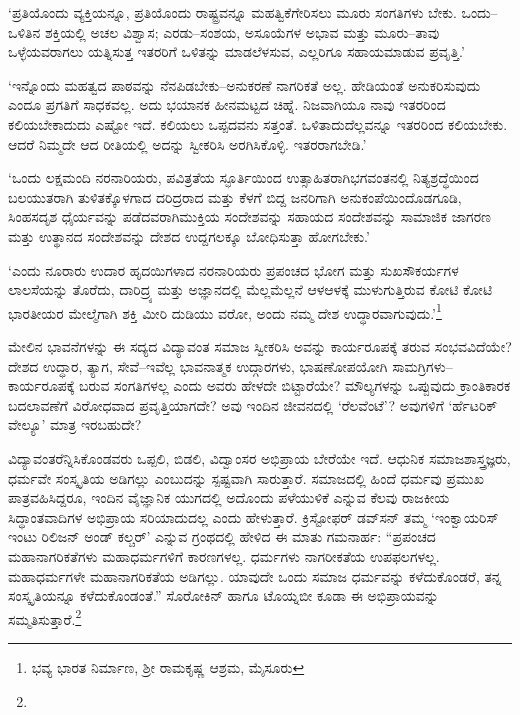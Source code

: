 ‘ಪ್ರತಿಯೊಂದು ವ್ಯಕ್ತಿಯನ್ನೂ, ಪ್ರತಿಯೊಂದು ರಾಷ್ಟ್ರವನ್ನೂ ಮಹತ್ವಿಕೆಗೇರಿಸಲು ಮೂರು ಸಂಗತಿಗಳು ಬೇಕು. ಒಂದು–ಒಳಿತಿನ ಶಕ್ತಿಯಲ್ಲಿ ಅಚಲ ವಿಶ್ವಾಸ; ಎರಡು–ಸಂಶಯ, ಅಸೂಯೆಗಳ ಅಭಾವ ಮತ್ತು ಮೂರು–ತಾವು ಒಳ್ಳೆಯವರಾಗಲು ಯತ್ನಿಸುತ್ತ ಇತರರಿಗೆ ಒಳಿತನ್ನು ಮಾಡ\-ಲೆಳಸುವ, ಎಲ್ಲರಿಗೂ ಸಹಾಯಮಾಡುವ ಪ್ರವೃತ್ತಿ.’

‘ಇನ್ನೊಂದು ಮಹತ್ವದ ಪಾಠವನ್ನು ನೆನಪಿಡಬೇಕು–ಅನುಕರಣೆ ನಾಗರಿಕತೆ ಅಲ್ಲ. ಹೇಡಿಯಂತೆ ಅನುಕರಿಸುವುದು ಎಂದೂ ಪ್ರಗತಿಗೆ ಸಾಧಕವಲ್ಲ. ಅದು ಭಯಾನಕ ಹೀನಮಟ್ಟದ ಚಿಹ್ನೆ. ನಿಜವಾಗಿಯೂ ನಾವು ಇತರರಿಂದ ಕಲಿಯಬೇಕಾದುದು ಎಷ್ಟೋ ಇದೆ. ಕಲಿಯಲು ಒಪ್ಪದವನು ಸತ್ತಂತೆ. ಒಳಿತಾದುದೆಲ್ಲವನ್ನೂ ಇತರರಿಂದ ಕಲಿಯಬೇಕು. ಆದರೆ ನಿಮ್ಮದೇ ಆದ ರೀತಿಯಲ್ಲಿ ಅದನ್ನು ಸ್ವೀಕರಿಸಿ ಅರಗಿಸಿಕೊಳ್ಳಿ. ಇತರರಾಗಬೇಡಿ.’

‘ಒಂದು ಲಕ್ಷಮಂದಿ ನರನಾರಿಯರು, ಪವಿತ್ರತೆಯ ಸ್ಫೂರ್ತಿಯಿಂದ ಉತ್ಸಾಹಿತರಾಗಿ\break ಭಗವಂತನಲ್ಲಿ ನಿತ್ಯಶ್ರದ್ಧೆಯಿಂದ ಬಲಯುತರಾಗಿ ತುಳಿತಕ್ಕೊಳಗಾದ ದರಿದ್ರರಾದ ಮತ್ತು ಕೆಳಗೆ ಬಿದ್ದ ಜನರಿಗಾಗಿ ಅನುಕಂಪೆಯಿಂದೊಡಗೂಡಿ, ಸಿಂಹಸದೃಶ ಧೈರ್ಯವನ್ನು ಪಡೆದವರಾಗಿ\break ಮುಕ್ತಿಯ ಸಂದೇಶವನ್ನು ಸಹಾಯದ ಸಂದೇಶವನ್ನು ಸಾಮಾಜಿಕ ಜಾಗರಣ ಮತ್ತು ಉತ್ಥಾನದ ಸಂದೇಶವನ್ನು ದೇಶದ ಉದ್ದಗಲಕ್ಕೂ ಬೋಧಿಸುತ್ತಾ ಹೋಗಬೇಕು.’

‘ಎಂದು ನೂರಾರು ಉದಾರ ಹೃದಯಿಗಳಾದ ನರನಾರಿಯರು ಪ್ರಪಂಚದ ಭೋಗ ಮತ್ತು ಸುಖಸೌಕರ್ಯಗಳ ಲಾಲಸೆಯನ್ನು ತೊರೆದು, ದಾರಿದ್ರ್ಯ ಮತ್ತು ಅಜ್ಞಾನದಲ್ಲಿ ಮೆಲ್ಲಮೆಲ್ಲನೆ ಆಳಆಳಕ್ಕೆ ಮುಳುಗುತ್ತಿರುವ ಕೋಟಿ ಕೋಟಿ ಭಾರತೀಯರ ಮೇಲ್ಮೆಗಾಗಿ ಶಕ್ತಿ ಮೀರಿ ದುಡಿಯು ವರೋ, ಅಂದು ನಮ್ಮ ದೇಶ ಉದ್ಧಾರವಾಗುವುದು.’\footnote{ಭವ್ಯ ಭಾರತ ನಿರ್ಮಾಣ, ಶ‍್ರೀ ರಾಮಕೃಷ್ಣ ಆಶ್ರಮ, ಮೈಸೂರು}

ಮೇಲಿನ ಭಾವನೆಗಳನ್ನು ಈ ಸದ್ಯದ ವಿದ್ಯಾವಂತ ಸಮಾಜ ಸ್ವೀಕರಿಸಿ ಅವನ್ನು ಕಾರ್ಯರೂಪಕ್ಕೆ ತರುವ ಸಂಭವವಿದೆಯೇ? ದೇಶದ ಉದ್ಧಾರ, ತ್ಯಾಗ, ಸೇವೆ–ಇವೆಲ್ಲ ಭಾವನಾತ್ಮಕ ಉದ್ಗಾರಗಳು, ಭಾಷಣೋಪಯೋಗಿ ಸಾಮಗ್ರಿಗಳು–ಕಾರ್ಯರೂಪಕ್ಕೆ ಬರುವ ಸಂಗತಿಗಳಲ್ಲ ಎಂದು ಅವರು ಹೇಳದೇ ಬಿಟ್ಟಾರೆಯೇ? ಮೌಲ್ಯಗಳನ್ನು ಒಪ್ಪುವುದು ಕ್ರಾಂತಿಕಾರಕ ಬದಲಾವಣೆಗೆ ವಿರೋಧವಾದ ಪ್ರವೃತ್ತಿಯಾಗದೇ? ಅವು ಇಂದಿನ ಜೀವನದಲ್ಲಿ ‘ರೆಲವೆಂಟೆ’? ಅವುಗಳಿಗೆ ‘ರ್ಹೆಟರಿಕ್ ವೇಲ್ಯೂ’ ಮಾತ್ರ ಇರಬಹುದೇ?

ವಿದ್ಯಾವಂತರೆನ್ನಿಸಿಕೊಂಡವರು ಒಪ್ಪಲಿ, ಬಿಡಲಿ, ವಿದ್ವಾಂಸರ ಅಭಿಪ್ರಾಯ ಬೇರೆಯೇ ಇದೆ. ಆಧುನಿಕ ಸಮಾಜಶಾಸ್ತ್ರಜ್ಞರು, ಧರ್ಮವೇ ಸಂಸ್ಕೃತಿಯ ಅಡಿಗಲ್ಲು ಎಂಬುದನ್ನು ಸ್ಪಷ್ಟವಾಗಿ ಸಾರುತ್ತಾರೆ. ಸಮಾಜದಲ್ಲಿ ಹಿಂದೆ ಧರ್ಮವು ಪ್ರಮುಖ ಪಾತ್ರವಹಿಸಿದ್ದರೂ, ಇಂದಿನ ವೈಜ್ಞಾನಿಕ ಯುಗದಲ್ಲಿ ಅದೊಂದು ಪಳೆಯುಳಿಕೆ ಎನ್ನುವ ಕೆಲವು ರಾಜಕೀಯ ಸಿದ್ಧಾಂತವಾದಿಗಳ ಅಭಿಪ್ರಾಯ ಸರಿಯಾದುದಲ್ಲ ಎಂದು ಹೇಳುತ್ತಾರೆ. ಕ್ರಿಸ್ಟೋಫರ್ ಡವ್​ಸನ್ ತಮ್ಮ ‘ಇಂಕ್ವಾಯರಿಸ್ ಇಂಟು ರಿಲಿಜನ್ ಅಂಡ್ ಕಲ್ಚರ್​’ ಎನ್ನುವ ಗ್ರಂಥದಲ್ಲಿ ಹೇಳಿದ ಈ ಮಾತು ಗಮನಾರ್ಹ: “ಪ್ರಪಂಚದ ಮಹಾ\-ನಾಗರಿ\-ಕತೆಗಳು ಮಹಾಧರ್ಮಗಳಿಗೆ ಕಾರಣಗಳಲ್ಲ. ಧರ್ಮಗಳು ನಾಗರೀಕತೆಯ ಉಪಫಲಗಳಲ್ಲ. ಮಹಾಧರ್ಮಗಳೇ ಮಹಾನಾಗರಿಕತೆಯ ಅಡಿಗಲ್ಲು. ಯಾವುದೇ ಒಂದು ಸಮಾಜ ಧರ್ಮವನ್ನು ಕಳೆದುಕೊಂಡರೆ, ತನ್ನ ಸಂಸ್ಕೃತಿಯನ್ನೂ ಕಳೆದುಕೊಂಡಂತೆ.” ಸೊರೋಕಿನ್ ಹಾಗೂ ಟೊಯ್ನಬೀ ಕೂಡಾ ಈ ಅಭಿಪ್ರಾಯವನ್ನು ಸಮ್ಮತಿಸುತ್ತಾರೆ.\footnote{}

